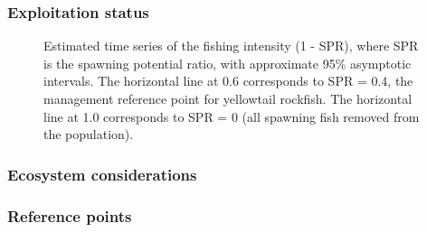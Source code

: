 \documentclass[
]{scrartcl}
\begin{document}
\clearpage

\subsubsection{Exploitation status}\label{exploitation-status}



\begin{figure}


\caption{\label{fig-es-spr}Estimated time series of the fishing
intensity (1 - SPR), where SPR is the spawning potential ratio, with
approximate 95\% asymptotic intervals. The horizontal line at 0.6
corresponds to SPR = 0.4, the management reference point for yellowtail
rockfish. The horizontal line at 1.0 corresponds to SPR = 0 (all
spawning fish removed from the population).}

\end{figure}%

\clearpage

\subsubsection{Ecosystem considerations}\label{ecosystem-considerations}

\subsubsection{Reference points}\label{reference-points}
\end{document}
